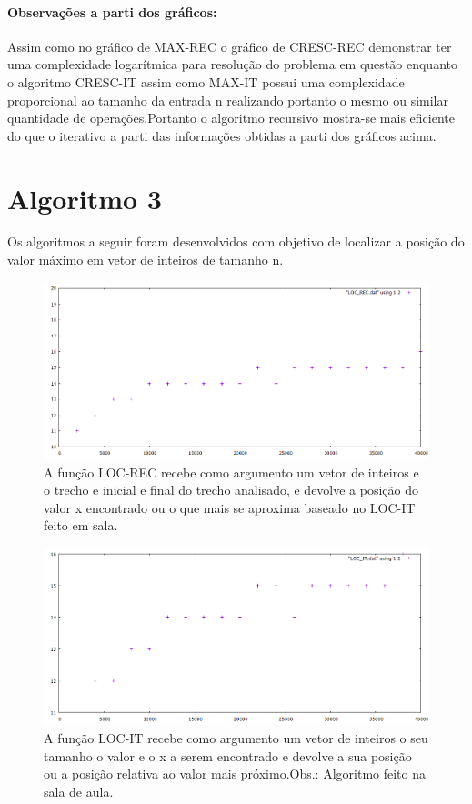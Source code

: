\documentclass[12pt]{article}
\begin{document}
	
	\paragraph{Observações a parti dos gráficos: }  Assim como no gráfico de MAX-REC o gráfico de CRESC-REC demonstrar ter uma complexidade logarítmica para resolução do  problema em questão enquanto o algoritmo CRESC-IT assim como MAX-IT possui uma complexidade proporcional ao tamanho da entrada n realizando portanto o mesmo ou similar quantidade de operações.Portanto o algoritmo recursivo mostra-se mais eficiente do que o iterativo a parti das informações obtidas a parti dos gráficos acima.
	
	
	
	
	
	
	
	
	\section{Algoritmo 3} \label{sec:LOC}
	
	Os algoritmos a seguir foram desenvolvidos com objetivo de localizar a posição do valor máximo em vetor de inteiros de tamanho n.
	
	
	\begin{figure}[h]
		\centering
		\includegraphics[width=0.7\linewidth]{Graficos/LOC_REC}
		\caption[Gráfico LOC-REC]{A função LOC-REC recebe como argumento um vetor de inteiros e o trecho e inicial e final do trecho analisado, e devolve a posição do valor x encontrado ou o que mais se aproxima baseado no LOC-IT feito em sala.}
		\label{fig:locrec}
	\end{figure}
	
	\begin{figure}[h]
		\centering
		\includegraphics[width=0.7\linewidth]{Graficos/LOC_IT}
		\caption[Gráfico LOC-IT]{A função LOC-IT recebe como argumento um vetor de inteiros o seu tamanho o valor e o x a serem encontrado e devolve a sua posição ou a posição relativa ao valor mais próximo.Obs.: Algoritmo feito na sala de aula.}
		\label{fig:locit}
	\end{figure}
	
\end{document}
